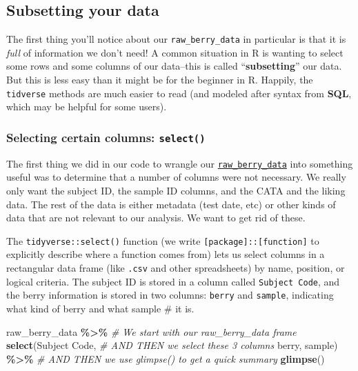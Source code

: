 \documentclass[
]{book}
\newenvironment{Shaded}{\begin{snugshade}}{\end{snugshade}}
\newcommand{\AttributeTok}[1]{\textcolor[rgb]{0.13,0.29,0.53}{#1}}
\newcommand{\CommentTok}[1]{\textcolor[rgb]{0.56,0.35,0.01}{\textit{#1}}}
\newcommand{\FunctionTok}[1]{\textcolor[rgb]{0.13,0.29,0.53}{\textbf{#1}}}
\newcommand{\NormalTok}[1]{#1}
\newcommand{\SpecialCharTok}[1]{\textcolor[rgb]{0.81,0.36,0.00}{\textbf{#1}}}
\newcommand{\StringTok}[1]{\textcolor[rgb]{0.31,0.60,0.02}{#1}}
\begin{document}
\hypertarget{subsetting-your-data}{%
\subsection{Subsetting your data}\label{subsetting-your-data}}

The first thing you'll notice about our \texttt{raw\_berry\_data} in particular is that it is \emph{full} of information we don't need! A common situation in R is wanting to select some rows and some columns of our data--this is called ``\textbf{subsetting}'' our data. But this is less easy than it might be for the beginner in R. Happily, the \texttt{tidverse} methods are much easier to read (and modeled after syntax from \textbf{SQL}, which may be helpful for some users).

\hypertarget{selecting-certain-columns-select}{%
\subsubsection{\texorpdfstring{Selecting certain columns: \texttt{select()}}{Selecting certain columns: select()}}\label{selecting-certain-columns-select}}

The first thing we did in our code to wrangle our \protect\hyperlink{berries}{\texttt{raw\_berry\_data}} into something useful was to determine that a number of columns were not necessary. We really only want the subject ID, the sample ID columns, and the CATA and the liking data. The rest of the data is either metadata (test date, etc) or other kinds of data that are not relevant to our analysis. We want to get rid of these.

The \texttt{tidyverse::select()} function (we write \texttt{{[}package{]}::{[}function{]}} to explicitly describe where a function comes from) lets us select columns in a rectangular data frame (like \texttt{.csv} and other spreadsheets) by name, position, or logical criteria. The subject ID is stored in a column called \texttt{Subject\ Code}, and the berry information is stored in two columns: \texttt{berry} and \texttt{sample}, indicating what kind of berry and what sample \# it is.

\begin{Shaded}
\begin{Highlighting}[]
\NormalTok{raw\_berry\_data }\SpecialCharTok{\%\textgreater{}\%}        \CommentTok{\# We start with our raw\_berry\_data frame}
  \FunctionTok{select}\NormalTok{(}\StringTok{\textasciigrave{}}\AttributeTok{Subject Code}\StringTok{\textasciigrave{}}\NormalTok{,  }\CommentTok{\# AND THEN we select these 3 columns}
\NormalTok{         berry,}
\NormalTok{         sample) }\SpecialCharTok{\%\textgreater{}\%}      \CommentTok{\# AND THEN we use glimpse() to get a quick summary}
  \FunctionTok{glimpse}\NormalTok{()}
\end{Highlighting}
\end{Shaded}
\end{document}
